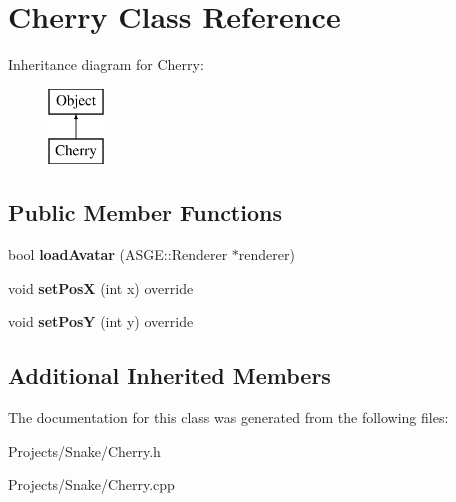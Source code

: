 \hypertarget{class_cherry}{}\section{Cherry Class Reference}
\label{class_cherry}
Inheritance diagram for Cherry\+:\begin{figure}[H]
\begin{center}
\leavevmode
\includegraphics[height=2.000000cm]{class_cherry}
\end{center}
\end{figure}
\subsection*{Public Member Functions}
\begin{DoxyCompactItemize}
\item 
\mbox{\label{class_cherry_a7330f4991deb5af8c445e20a0ae2c9f8}} 
bool {\bfseries load\+Avatar} (A\+S\+G\+E\+::\+Renderer $\ast$renderer)
\item 
\mbox{\label{class_cherry_a19bb61762601c45b527a35d9ad0d7f19}} 
void {\bfseries set\+PosX} (int x) override
\item 
\mbox{\label{class_cherry_a04ee41eb4c488a3f010a44d3d6c545f1}} 
void {\bfseries set\+PosY} (int y) override
\end{DoxyCompactItemize}
\subsection*{Additional Inherited Members}


The documentation for this class was generated from the following files\+:\begin{DoxyCompactItemize}
\item 
Projects/\+Snake/Cherry.\+h\item 
Projects/\+Snake/Cherry.\+cpp\end{DoxyCompactItemize}
